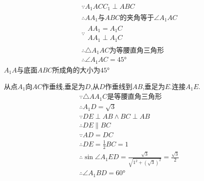 \begin{questions}
\begin{solution}
\begin{center}
		\end{center}
		\begin{penum}
			\item
			      \begin{align*}
				       & \because A_1ACC_1 \perp ABC                         \\
				       & \therefore AA_1\text{与}ABC\text{的夹角等于}\angle{A_1AC} \\
				       & \because
				      \begin{array}{l}
					      AA_1 = A_1C \\
					      AA_1 \perp A_1C
				      \end{array}                                        \\
				       & \therefore \triangle{A_1AC}\text{为等腰直角三角形}          \\
				       & \therefore \angle{A_1AC} = \ang{45}
			      \end{align*}
			      $A_1A$与底面$ABC$所成角的大小为$\ang{45}$
			\item 从点$A_1$向$AC$作垂线,垂足为$D$,从$D$作垂线到$AB$,垂足为$E$.连接$A_1E$.
			      \begin{align*}
				       & \because \triangle{AA_1C}\text{是等腰直角三角形}                                                       \\
				       & \therefore A_1D = \sqrt{3}                                                                     \\
				       & \because DE \perp AB \land BC \perp AB                                                         \\
				       & \therefore DE \parallel BC                                                                     \\
				       & \because AD = DC                                                                               \\
				       & \therefore DE = \frac12BC = 1                                                                  \\
				       & \therefore \sin\angle{A_1ED} = \frac{\sqrt{3}}{\sqrt{1^2 + (\sqrt{3})^2}} = \frac{\sqrt{3}}{2} \\
				       & \therefore \angle{A_1BD} = \ang{60}

\end{align*}
\end{penum}
\end{solution}
\end{questions}

